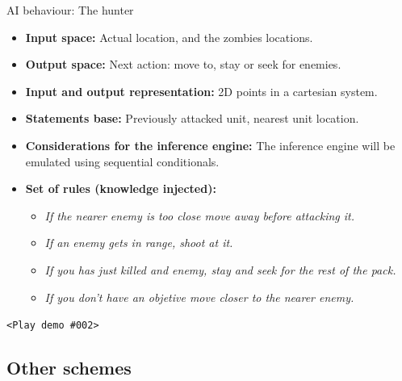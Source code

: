 \documentclass[10pt]{beamer}
\begin{document}
	    \begin{frame}{AI behaviour: The hunter}
	    \small
	     \begin{itemize}
	      \item \textbf{Input space:} Actual location, and the zombies locations.
	      \item \textbf{Output space:} Next action: move to, stay or seek for enemies.
	      \item \textbf{Input and output representation:} 2D points in a cartesian system.
	      \item \textbf{Statements base:} Previously attacked unit, nearest unit location.
	      \item \textbf{Considerations for the inference engine:} The inference engine will be emulated using sequential conditionals.
	      \item \textbf{Set of rules (knowledge injected):}\newline
		  \begin{itemize}
		    \footnotesize
		    \item \textit{If the nearer enemy is too close move away before attacking it.}
		    \item \textit{If an enemy gets in range, shoot at it.}
		    \item \textit{If you has just killed and enemy, stay and seek for the rest of the pack.}
		    \item \textit{If you don't have an objetive move closer to the nearer enemy.}
		  \end{itemize}

	      \end{itemize}
	    \begin{center} 
	    \texttt{<Play demo \#002>}	     
	    \end{center}

	    \end{frame}


	    \subsection{Other schemes}
\end{document}
